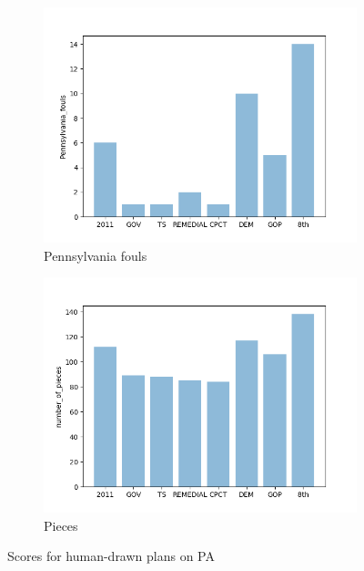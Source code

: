 \documentclass{mgggarticle}
\begin{document}
\begin{figure}
\begin{subfigure}{0.4\textwidth}
\centering
\includegraphics[width=\textwidth]{figs/bars/Pennsylvania_fouls_bar.png}
\caption{Pennsylvania fouls}
\end{subfigure}
\begin{subfigure}{0.4\textwidth}
\centering
\includegraphics[width=\textwidth]{figs/bars/number_of_pieces_bar.png}
\caption{Pieces}
\end{subfigure}
\caption{Scores for human-drawn plans on PA}
\end{figure}

\end{document}
